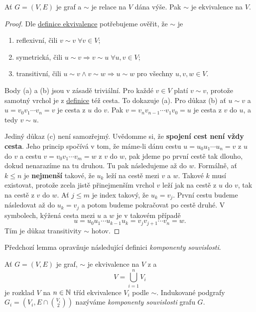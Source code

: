 \begin{lemma}
 \label{lem:cesta-ekvivalence}
 Ať $G = (V,E)$ je graf a $ \sim $ je relace na $V$ dána výše. Pak $ \sim $ je
 ekvivalence na $V$.
\end{lemma}
\begin{proof}
 Dle \hyperref[def:ekvivalence]{definice ekvivalence} potřebujeme ověřit, že $
 \sim $ je
 \begin{enumerate}[label=(\alph*)]
  \item reflexivní, čili $v \sim v \; \forall v \in V$;
  \item symetrická, čili $u \sim v \Rightarrow v \sim u \; \forall u,v \in
   V$;
  \item transitivní, čili $u \sim v \wedge v \sim w \Rightarrow u \sim w$ pro
   všechny $u,v,w \in V$.
 \end{enumerate}
 Body (a) a (b) jsou v zásadě triviální. Pro každé $v \in V$ platí $v \sim v$,
 protože samotný vrchol je z \hyperref[def:cesta]{definice} též cesta. To
 dokazuje (a). Pro důkaz (b) ať $u \sim v$ a $u=v_0v_1\cdots v_n=v$ je cesta z
 $u$ do $v$. Pak $v=v_nv_{n-1}\cdots v_1v_0=u$ je cesta z $v$ do $u$, a tedy
 $v \sim u$.

 Jediný důkaz (c) není samozřejmý. Uvědomme si, že \textbf{spojení cest není
 vždy cesta}. Jeho princip spočívá v tom, že máme-li dánu cestu $u=u_0u_1\cdots
 u_n=v$ z $u$ do $v$ a cestu $v=v_0v_1\cdots v_m=w$ z $v$ do $w$, pak jdeme po
 první cestě tak dlouho, dokud nenarazíme na tu druhou. Tu pak následujeme až do
 $w$. Formálně, ať $k \leq n$ je \textbf{nejmenší} takové, že $u_k$ leží na
 cestě mezi $v$ a $w$. Takové $k$ musí existovat, protože zcela jistě
 přinejmenším vrchol $v$ leží jak na cestě z $u$ do $v$, tak na cestě z $v$ do
 $w$. Ať $j \leq m$ je index takový, že $u_k = v_j$. První cestu budeme
 následovat až do $u_k = v_j$ a potom budeme pokračovat po cestě druhé. V
 symbolech, kýžená cesta mezi $u$ a $w$ je v takovém případě
 \[
  u=u_0u_1\cdots u_{k-1}u_k=v_jv_{j+1}\cdots v_n=w.
 \]
 Tím je důkaz transitivity $ \sim $ hotov.
\end{proof}

Předchozí lemma opravňuje následující definici \emph{komponenty souvislosti}.

\begin{definition}
 \label{def:komponenta-souvislosti}
 Ať $G = (V,E)$ je graf, $ \sim $ je ekvivalence na $V$ z
  a 
 \[
  V = \bigcup_{i = 1}^{n} V_i
 \]
 je rozklad $V$ na $n \in \mathbb{N}$ tříd ekvivalence $V_i$ podle $ \sim $. Indukované
 podgrafy $G_i = (V_i, E \cap \binom{V_i}{2})$ nazýváme \emph{komponenty
 souvislosti} grafu $G$.
\end{definition}

